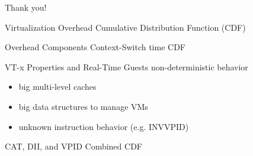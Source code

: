 \documentclass[10pt,hyperref={hyperfootnotes=false}, xcolor={usenames, dvipsnames}]{beamer}
\begin{document}
\begin{frame}
  \center\LARGE{Thank you!}
\end{frame}

\begin{frame}[allowframebreaks]{Virtualization Overhead} {Cumulative Distribution Function (CDF)}
	
\end{frame}

\begin{frame}[allowframebreaks]{Overhead Components} {Context-Switch time CDF}
    \begingroup
	
	\endgroup
\end{frame}

\begin{frame}{VT-x Properties and Real-Time Guests} {non-deterministic behavior}
   \begin{itemize}
    \item {big multi-level caches} \pause{}
    \item {big data structures to manage VMs} \pause{}
    \item {unknown instruction behavior (e.g. INVVPID)}
   \end{itemize}
\end{frame}

\begin{frame}[allowframebreaks]{CAT, DII, and VPID Combined} {CDF}
	
\end{frame}
\end{document}
